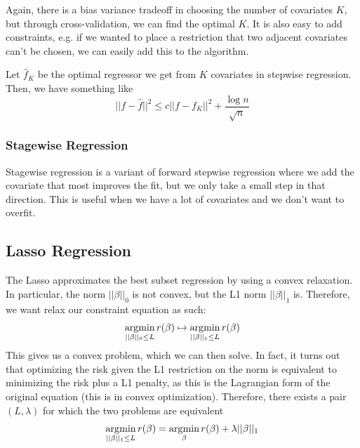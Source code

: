     Again, there is a bias variance tradeoff in choosing the number of covariates $K$, but through cross-validation, we can find the optimal $K$. It is also easy to add constraints, e.g. if we wanted to place a restriction that two adjacent covariates can't be chosen, we can easily add this to the algorithm. 

    \begin{theorem}
      Let $\hat{f}_K$ be the optimal regressor we get from $K$ covariates in stepwise regression. Then, we have something like
      \begin{equation}
        ||f - \hat{f}||^2 \leq c ||f - f_K||^2 + \frac{\log{n}}{\sqrt{n}}
      \end{equation}
    \end{theorem}

    \subsubsection{Stagewise Regression} 

      Stagewise regression is a variant of forward stepwise regression where we add the covariate that most improves the fit, but we only take a small step in that direction. This is useful when we have a lot of covariates and we don't want to overfit. 

  \subsection{Lasso Regression}

    The Lasso approximates the best subset regression by using a convex relaxation. In particular, the norm $||\beta||_0$ is not convex, but the L1 norm $||\beta||_1$ is. Therefore, we want relax our constraint equation as such: 
    \begin{equation}
      \argmin_{||\beta||_0 \leq L} r(\beta) \mapsto \argmin_{||\beta||_1 \leq L} r(\beta)
    \end{equation}
    This gives us a convex problem, which we can then solve. In fact, it turns out that optimizing the risk given the L1 restriction on the norm is equivalent to minimizing the risk plus a L1 penalty, as this is the Lagrangian form of the original equation (this is in convex optimization). Therefore, there exists a pair $(L, \lambda)$ for which the two problems are equivalent 
    \begin{equation}
      \argmin_{||\beta||_1 \leq L} r(\beta) = \argmin_{\beta} r(\beta) + \lambda ||\beta||_1
    \end{equation}

